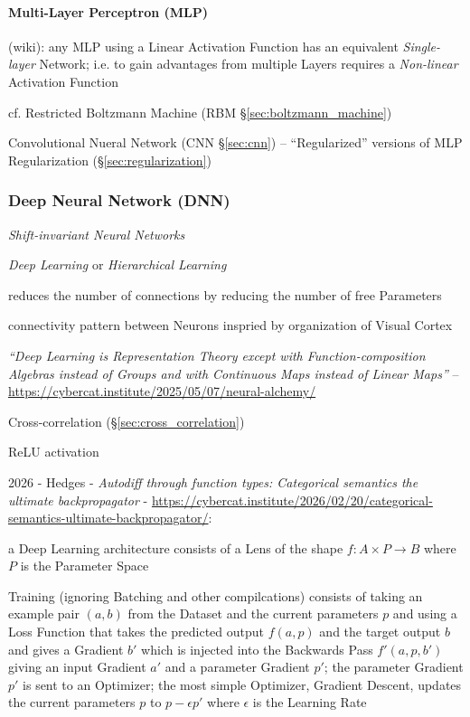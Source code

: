 \paragraph{Multi-Layer Perceptron (MLP)}\label{sec:mlp}\hfill

(wiki): any MLP using a Linear Activation Function has an equivalent
\emph{Single-layer} Network; i.e. to gain advantages from multiple Layers
requires a \emph{Non-linear} Activation Function

cf. Restricted Boltzmann Machine (RBM \S\ref{sec:boltzmann_machine})

\fist Convolutional Nueral Network (CNN \S\ref{sec:cnn}) -- ``Regularized''
versions of MLP \fist Regularization (\S\ref{sec:regularization})



\subsubsection{Deep Neural Network (DNN)}\label{sec:dnn}

\emph{Shift-invariant Neural Networks}

\emph{Deep Learning} or \emph{Hierarchical Learning}

reduces the number of connections by reducing the number of free Parameters

connectivity pattern between Neurons inspried by organization of Visual Cortex

\emph{``Deep Learning is Representation Theory except with Function-composition
Algebras instead of Groups and with Continuous Maps instead of Linear Maps''}
--\url{https://cybercat.institute/2025/05/07/neural-alchemy/}

Cross-correlation (\S\ref{sec:cross_correlation})

ReLU activation

2026 - Hedges - \emph{Autodiff through function types: Categorical semantics the
ultimate backpropagator} -
\url{https://cybercat.institute/2026/02/20/categorical-semantics-ultimate-backpropagator/}:

a Deep Learning architecture consists of a Lens of the shape $f : A \times P \to
B$ where $P$ is the Parameter Space

Training (ignoring Batching and other compilcations) consists of taking an
example pair $(a,b)$ from the Dataset and the current parameters $p$ and using a
Loss Function that takes the predicted output $f(a,p)$ and the target output $b$
and gives a Gradient $b'$ which is injected into the Backwards Pass $f'(a,p,b')$
giving an input Gradient $a'$ and a parameter Gradient $p'$; the parameter
Gradient $p'$ is sent to an Optimizer; the most simple Optimizer, Gradient
Descent, updates the current parameters $p$ to $p - \epsilon p'$ where
$\epsilon$ is the Learning Rate

